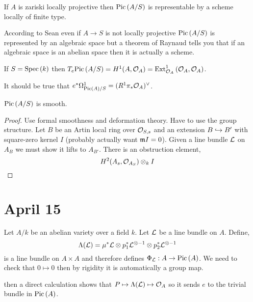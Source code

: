\documentclass[12pt]{article}
\begin{document}
\begin{theorem}[Grothendieck]
If $A$ is zariski locally projective then $\mathrm{Pic} \left( A/S \right)$ is representable by a scheme locally of finite type.
\end{theorem}

\begin{rmk}
According to Sean even if $A \to S$ is not locally projective $\mathrm{Pic} \left( A/S \right)$ is represented by an algebraic space but a theorem of Raynaud tells you that if an algebraic space is an abelian space then it is actually a scheme. 
\end{rmk}

\begin{prop}
If $S = \mathrm{Spec}\left( k \right)$ then $T_e \mathrm{Pic} \left( A/S \right) = H^1(A, \mathcal{O}_{A}) = \mathrm{Ext}^{1}_{\mathcal{O}_{A}} \left( \mathcal{O}_{A}, \mathcal{O}_{A} \right)$. 
\end{prop}

\begin{rmk}
It should be true that $e^* \Omega^1_{\mathrm{Pic} \left( A \right)/S} = (R^1 \pi_* \mathcal{O}_{A})^\vee$. 
\end{rmk}

\begin{prop}
$\mathrm{Pic} \left( A/S \right)$ is smooth. 
\end{prop}

\begin{proof}
Use formal smoothness and deformation theory. Have to use the group structure. Let $B$ be an Artin local ring over $\mathcal{O}_{S, s}$ and an extension $B \hookrightarrow B'$ with square-zero kernel $I$ (probably actually want $\mathfrak{m} I = 0$). Given a line bundle $\mathcal{L}$ on $A_{B}$ we must show it lifts to $A_{B'}$. There is an obstruction element,
\[ H^2(A_s, \mathcal{O}_{A_S}) \otimes_k I \]
\end{proof}

\section{April 15}

Let $A/k$ be an abelian variety over a field $k$. Let $\mathcal{L}$ be a line bundle on $A$. Define,
\[ \Lambda(\mathcal{L}) = \mu^* \mathcal{L} \otimes p_1^* \mathcal{L}^{\otimes -1} \otimes p_2^* \mathcal{L}^{\otimes -1} \]
is a line bundle on $A \times A$ and therefore defines $\Phi_{\mathcal{L}} : A \to \mathrm{Pic} \left( A \right)$. We need to check that $0 \mapsto 0$ then by rigidity it is automatically a group map. 
\begin{center}
\end{center}
then a direct calculation shows that $P \mapsto \Lambda(\mathcal{L}) \mapsto \mathcal{O}_{A}$ so it sends $e$ to the trivial bundle in $\mathrm{Pic} \left( A \right)$. 
\end{document}
